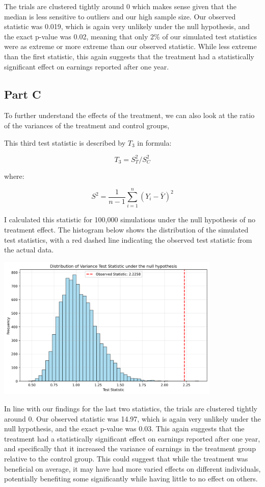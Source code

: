 \documentclass[12pt]{article}
\begin{document}
The trials are clustered tightly around 0 which makes sense given that the median is less sensitive to outliers and our high sample size. Our observed statistic was 0.019, which is again very unlikely under the null hypothesis, and the exact p-value was 0.02, meaning that only 2\% of our simulated test statistics were as extreme or more extreme than our observed statistic. While less extreme than the first statistic, this again suggests that the treatment had a statistically significant effect on earnings reported after one year.


\subsection{Part C}

To further understand the effects of the treatment, we can also look at the ratio of the variances of the treatment and control groups, 
\newline

This third test statistic is described by $T_3$ in formula:

\[T_3 = S^2_T / S^2_C\]

where:

\[S^2 = \frac{1}{n-1} \sum_{i=1}^{n} (Y_i - \bar{Y})^2\]

I calculated this statistic for 100,000 simulations under the null hypothesis of no treatment effect. The histogram below shows the distribution of the simulated test statistics, with a red dashed line indicating the observed test statistic from the actual data.

\vspace*{2em}
\includegraphics[width=0.8\textwidth]{stat3_graph.png}
\vspace*{2em}

In line with our findings for the last two statistics, the trials are clustered tightly around 0. Our observed statistic was 14.97, which is again very unlikely under the null hypothesis, and the exact p-value was 0.03. This again suggests that the treatment had a statistically significant effect on earnings reported after one year, and specifically that it increased the variance of earnings in the treatment group relative to the control group. This could suggest that while the treatment was beneficial on average, it may have had more varied effects on different individuals, potentially benefiting some significantly while having little to no effect on others.
\end{document}
